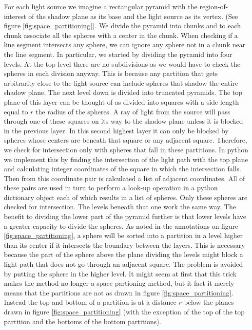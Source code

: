 \documentclass[10pt]{article}
\begin{document}
For each light source we imagine a rectangular pyramid with the region-of-interest of the shadow plane as its base and the light source as its vertex. (See figure \ref{fig:space_partitioning}). We divide the pyramid into chunks and to each chunk associate all the spheres with a center in the chunk. When checking if a line segment intersects any sphere, we can ignore any sphere not in a chunk near the line segment. In particular, we started by dividing the pyramid into four levels. At the top level there are no subdivisions as we would have to check the spheres in each division anyway. This is because any partition that gets arbitrarity close to the light source can include spheres that shadow the entire shadow plane. The next level down is divided into truncated pyramids. The top plane of this layer can be thought of as divided into squares with a side length equal to $r$ the radius of the spheres. A ray of light from the source will pass through one of these squares on its way to the shadow plane unless it is blocked in the previous layer. In this second highest layer it can only be blocked by spheres whose centers are beneath that square or any adjacent square. Therefore, we check for intersection only with spheres that fall in these partitions. In python we implement this by finding the intersection of the light path with the top plane and calculating integer coordinates of the square in which the intersection falls. Then from this coordinate pair is calculated a list of adjacent coordinates. All of these pairs are used in turn to perform a look-up operation in a python dictionary object each of which results in a list of spheres. Only these spheres are checked for intersection. The levels beneath that one work the same way. The benefit to dividing the lower part of the pyramid further is that lower levels have a greater capacity to divide the spheres. As noted in the annotations on figure \ref{fig:space_partitioning}, a sphere will be sorted into a partition in a level higher than its center if it intersects the boundary between the layers. This is necessary because the part of the sphere above the plane dividing the levels might block a light path that does not go through an adjacent square. The problem is avoided by putting the sphere in the higher level. It might seem at first that this trick makes the method no longer a space-partioning method, but it fact it merely means that the partitions are not as drawn in figure \ref{fig:space_partitioning}. Instead the top and bottom of a partition is at a distance $r$ below the planes drawn in figure \ref{fig:space_partitioning} (with the exception of the top of the top partition and the bottoms of the bottom partitions).
\end{document}

